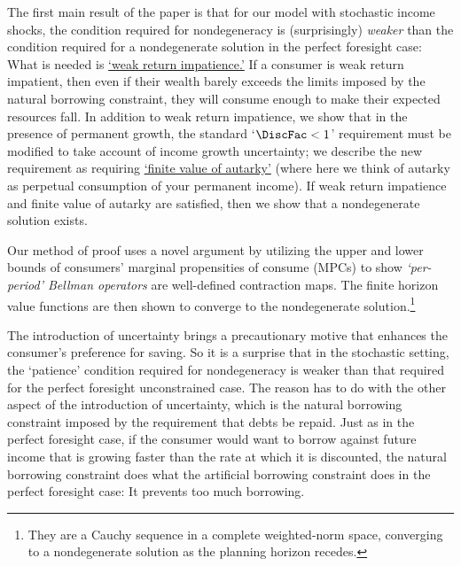 \documentclass[BufferStockTheory]{subfiles}
\begin{document}
The first main result of the paper is that for our model with stochastic income shocks, the condition required for nondegeneracy is (surprisingly) \textit{weaker} than the condition required for a nondegenerate solution in the perfect foresight case: What is needed is \hyperlink{WRIC}{`weak return impatience.'} If a consumer is weak return impatient, then even if their wealth barely exceeds the limits imposed by the natural borrowing constraint, they will consume enough to make their expected resources fall. In addition to weak return impatience, we show that in the presence of permanent growth, the standard `$\DiscFac<1$' requirement must be modified to take account of income growth uncertainty; we describe the new requirement as requiring \hyperlink{FVAC}{`finite value of autarky'} (where here we think of autarky as perpetual consumption of your permanent income). If weak return impatience and finite value of autarky are satisfied, then we show that a nondegenerate solution  exists.

Our method of proof uses a novel argument by utilizing the upper and lower bounds of consumers' marginal propensities of consume (MPCs) to show \textit{`per-period' Bellman operators} are well-defined contraction maps. The finite horizon value functions are then shown to converge to the nondegenerate solution.\footnote{They are a Cauchy sequence in a complete weighted-norm space, converging to a nondegenerate solution as the planning horizon recedes.}

The introduction of uncertainty brings a precautionary motive that enhances the consumer's preference for saving.  So it is a surprise that in the stochastic setting, the `patience' condition required for nondegeneracy is weaker than that required for the perfect foresight unconstrained case.  The reason has to do with the other aspect of the introduction of uncertainty, which is the natural borrowing constraint imposed by the requirement that debts be repaid.  Just as in the perfect foresight case, if the consumer would want to borrow against future income that is growing faster than the rate at which it is discounted, the natural borrowing constraint does what the artificial borrowing constraint does in the perfect foresight case: It prevents too much borrowing.

%

%
\end{document}
